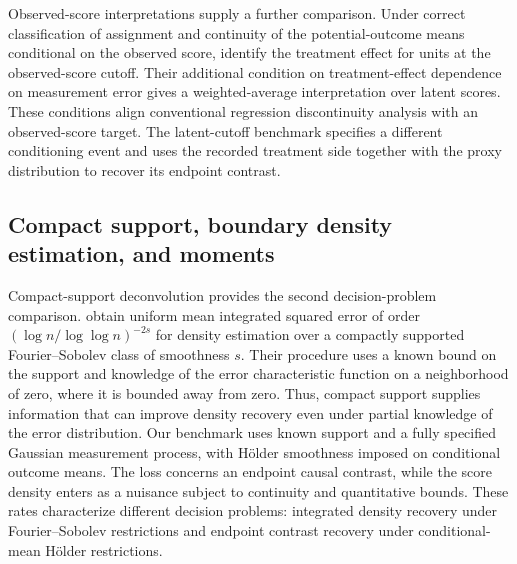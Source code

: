 Observed-score interpretations supply a further comparison. Under correct classification of assignment and continuity of the potential-outcome means conditional on the observed score, \citet[Section~2.1, Lemma~2.1]{DongKolesar2023IgnoreMeasurementError} identify the treatment effect for units at the observed-score cutoff. Their additional condition on treatment-effect dependence on measurement error gives a weighted-average interpretation over latent scores. These conditions align conventional regression discontinuity analysis with an observed-score target. The latent-cutoff benchmark specifies a different conditioning event and uses the recorded treatment side together with the proxy distribution to recover its endpoint contrast.

\subsection{Compact support, boundary density estimation, and moments}

Compact-support deconvolution provides the second decision-problem comparison. \citet[Theorem~1(a), fixed-support case]{Meister2007CompactSupport} obtain uniform mean integrated squared error of order \((\log n/\log\log n)^{-2s}\) for density estimation over a compactly supported Fourier--Sobolev class of smoothness \(s\). Their procedure uses a known bound on the support and knowledge of the error characteristic function on a neighborhood of zero, where it is bounded away from zero. Thus, compact support supplies information that can improve density recovery even under partial knowledge of the error distribution. Our benchmark uses known support and a fully specified Gaussian measurement process, with Hölder smoothness imposed on conditional outcome means. The loss concerns an endpoint causal contrast, while the score density enters as a nuisance subject to continuity and quantitative bounds. These rates characterize different decision problems: integrated density recovery under Fourier--Sobolev restrictions and endpoint contrast recovery under conditional-mean Hölder restrictions.

